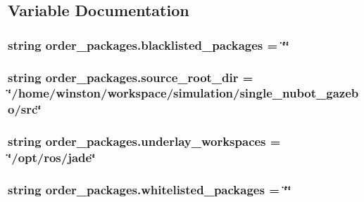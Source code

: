 \subsection{Variable Documentation}
\hypertarget{namespaceorder__packages_a29ea913f00c5a0e81d3c7688e7375507}{
\subsubsection[{blacklisted\-\_\-packages}]{\setlength{\rightskip}{0pt plus 5cm}string order\-\_\-packages.\-blacklisted\-\_\-packages = \char`\"{}\char`\"{}}}\label{namespaceorder__packages_a29ea913f00c5a0e81d3c7688e7375507}
\hypertarget{namespaceorder__packages_aff4fd297841de7fbddc2c0c33a6bab21}{
\subsubsection[{source\-\_\-root\-\_\-dir}]{\setlength{\rightskip}{0pt plus 5cm}string order\-\_\-packages.\-source\-\_\-root\-\_\-dir = \char`\"{}/home/winston/workspace/simulation/single\-\_\-nubot\-\_\-gazebo/src\char`\"{}}}\label{namespaceorder__packages_aff4fd297841de7fbddc2c0c33a6bab21}
\hypertarget{namespaceorder__packages_a11d102ff09fd2977b9075c4c722015d2}{
\subsubsection[{underlay\-\_\-workspaces}]{\setlength{\rightskip}{0pt plus 5cm}string order\-\_\-packages.\-underlay\-\_\-workspaces = \char`\"{}/opt/ros/jade\char`\"{}}}\label{namespaceorder__packages_a11d102ff09fd2977b9075c4c722015d2}
\hypertarget{namespaceorder__packages_a84450a73e77dbf3689293b97dcb697a4}{
\subsubsection[{whitelisted\-\_\-packages}]{\setlength{\rightskip}{0pt plus 5cm}string order\-\_\-packages.\-whitelisted\-\_\-packages = \char`\"{}\char`\"{}}}\label{namespaceorder__packages_a84450a73e77dbf3689293b97dcb697a4}

